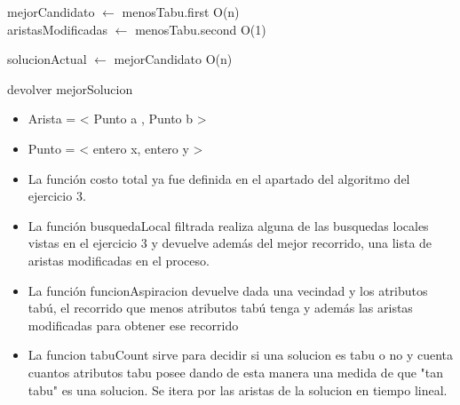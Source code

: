 \begin{algorithm}[H]
{{{		mejorCandidato $\leftarrow$ menosTabu.first \hfill O(n)\\
		aristasModificadas $\leftarrow$ menosTabu.second \hfill O(1)\\
	}  	
	
	
	solucionActual $\leftarrow$ mejorCandidato \hfill O(n)\\
		

  	

}

devolver mejorSolucion \\

}

\end{algorithm}

\begin{itemize}
\item Arista = < Punto a , Punto b >
\item Punto = < entero x, entero y >
\item La función costo total ya fue definida en el apartado del algoritmo del ejercicio 3.
\item La función busquedaLocal filtrada realiza alguna de las busquedas locales vistas en el ejercicio 3 y devuelve además del mejor recorrido, una lista de aristas modificadas en el proceso.
\item La función funcionAspiracion devuelve dada una vecindad y los atributos tabú, el recorrido que menos atributos tabú tenga y además las aristas modificadas para obtener ese recorrido
\item La funcion tabuCount sirve para decidir si una solucion es tabu o no y cuenta cuantos atributos tabu posee dando de esta manera una medida de que "tan tabu" es una solucion. Se itera por las aristas de la solucion en tiempo lineal.
\end{itemize}

